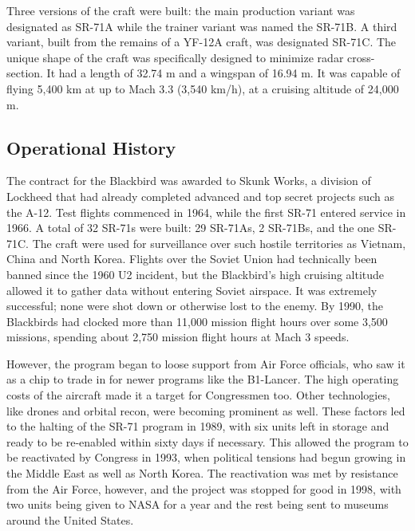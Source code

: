 \documentclass[12pt, draftclsnofoot, onecolumn]{IEEEtran}
\begin{document}
	Three versions of the craft were built: the main production variant was designated as SR-71A while the trainer variant was named the SR-71B. A third variant, built from the remains of a YF-12A craft, was designated SR-71C.
	The unique shape of the craft was specifically designed to minimize radar cross-section. It had a length of 32.74 m and a wingspan of 16.94 m. It was capable of flying 5,400 km at up to Mach 3.3 (3,540 km/h), at a cruising altitude of 24,000 m.


	\subsection{Operational History}
	The contract for the Blackbird was awarded to Skunk Works, a division of Lockheed that had already completed advanced and top secret projects such as the A-12. Test flights commenced in 1964, while the first SR-71 entered service in 1966. A total of 32 SR-71s were built: 29 SR-71As, 2 SR-71Bs, and the one SR-71C. The craft were used for surveillance over such hostile territories as Vietnam, China and North Korea. Flights over the Soviet Union had technically been banned since the 1960 U2 incident, but the Blackbird's high cruising altitude allowed it to gather data without entering Soviet airspace. It was extremely successful; none were shot down or otherwise lost to the enemy. By 1990, the Blackbirds had clocked more than 11,000 mission flight hours over some 3,500 missions, spending about 2,750 mission flight hours at Mach 3 speeds\cite{stats}.

	However, the program began to loose support from Air Force officials, who saw it as a chip to trade in for newer programs like the B1-Lancer. The high operating costs of the aircraft made it a target for Congressmen too. Other technologies, like drones and orbital recon, were becoming prominent as well. These factors led to the halting of the SR-71 program in 1989, with six units left in storage and ready to be re-enabled within sixty days if necessary. This allowed the program to be reactivated by Congress in 1993, when political tensions had begun growing in the Middle East as well as North Korea. The reactivation was met by resistance from the Air Force, however, and the project was stopped for good in 1998, with two units being given to NASA for a year and the rest being sent to museums around the United States.
	
\end{document}
